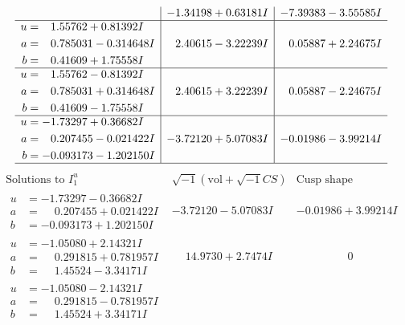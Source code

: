 \documentclass[1p]{elsarticle_modified}
\theoremstyle{definition}
\newcommand{\I}{\sqrt{-1}}
\begin{document}
$$\begin{array}{c|c|c}
 & -1.34198 + 0.63181 I & -7.39383 - 3.55585 I \\ \hline\begin{aligned}
u &= \phantom{-}1.55762 + 0.81392 I \\
a &= \phantom{-}0.785031 - 0.314648 I \\
b &= \phantom{-}0.41609 + 1.75558 I\end{aligned}
 & \phantom{-}2.40615 - 3.22239 I & \phantom{-}0.05887 + 2.24675 I \\ \hline\begin{aligned}
u &= \phantom{-}1.55762 - 0.81392 I \\
a &= \phantom{-}0.785031 + 0.314648 I \\
b &= \phantom{-}0.41609 - 1.75558 I\end{aligned}
 & \phantom{-}2.40615 + 3.22239 I & \phantom{-}0.05887 - 2.24675 I \\ \hline\begin{aligned}
u &= -1.73297 + 0.36682 I \\
a &= \phantom{-}0.207455 - 0.021422 I \\
b &= -0.093173 - 1.202150 I\end{aligned}
 & -3.72120 + 5.07083 I & -0.01986 - 3.99214 I\\
 \hline 
 \end{array}$$\newpage$$\begin{array}{c|c|c}  
\text{Solutions to }I^u_{1}& \I (\text{vol} + \sqrt{-1}CS) & \text{Cusp shape}\\
 \hline 
\begin{aligned}
u &= -1.73297 - 0.36682 I \\
a &= \phantom{-}0.207455 + 0.021422 I \\
b &= -0.093173 + 1.202150 I\end{aligned}
 & -3.72120 - 5.07083 I & -0.01986 + 3.99214 I \\ \hline\begin{aligned}
u &= -1.05080 + 2.14321 I \\
a &= \phantom{-}0.291815 + 0.781957 I \\
b &= \phantom{-}1.45524 - 3.34171 I\end{aligned}
 & \phantom{-}14.9730 + 2.7474 I & \phantom{-0.000000 } 0 \\ \hline\begin{aligned}
u &= -1.05080 - 2.14321 I \\
a &= \phantom{-}0.291815 - 0.781957 I \\
b &= \phantom{-}1.45524 + 3.34171 I\end{aligned}

\end{array}$$
\end{document}
